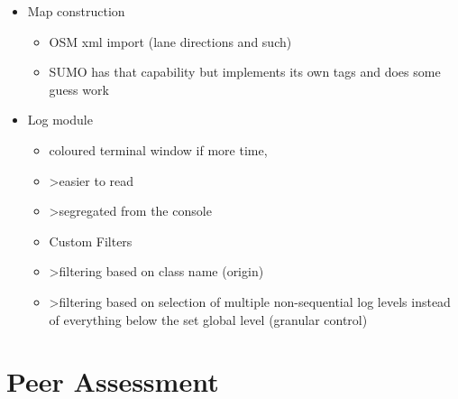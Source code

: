 \begin{itemize}
    \item Map construction
    \begin{itemize}
        \item OSM xml import (lane directions and such)
        \item SUMO has that capability but implements its own tags and does some guess work
    \end{itemize}

    \item Log module
    \begin{itemize}
        \item coloured terminal window if more time,
        \item >easier to read
        \item >segregated from the console
        \item Custom Filters
        \item >filtering based on class name (origin)
        \item >filtering based on selection of multiple non-sequential log levels instead of everything below the set global level (granular control)
    \end{itemize}
\end{itemize}



\section{Peer Assessment}
